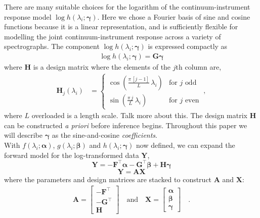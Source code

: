 \documentclass[modern]{aastex631}
\renewcommand{\vec}[1]{\mathbf{#1}}
\newcommand{\vecalpha}{\boldsymbol{\alpha}}
\newcommand{\vecbeta}{\boldsymbol{\beta}}
\newcommand{\vecgamma}{\boldsymbol{\gamma}}
\newcommand{\transpose}{^\top}
\newcommand{\todo}[1]{\textcolor{tab:red}{#1}}
\begin{document}
There are many suitable choices for the logarithm of the continuum-instrument response model $\log{h(\lambda_i;\vecgamma)}$. Here we chose a Fourier basis of sine and cosine functions because it is a linear representation, and is sufficiently flexible for modelling the joint continuum-instrument response across a variety of spectrographs. The component $\log{h(\lambda_i;\vecgamma)}$ is expressed compactly as
\begin{align}
    \log{h(\lambda_i;\vecgamma)} = \vec{G}\vecgamma
\end{align}
where $\vec{H}$ is a design matrix where the elements of the $j$th column are, %
\begin{align}
    \vec{H}_{j}(\lambda_i) & = \left\{\begin{array}{cl}\displaystyle\cos\left(\frac{\pi\,[j-1]}{L}\,\lambda_i\right) & \mbox{for $j$ odd} \\[3ex]
                                       \displaystyle\sin\left(\frac{\pi\,j}{L}\,\lambda_i\right) & \mbox{for $j$ even}\end{array}\right. ~,
\end{align}
\noindent{}where $L$ \todo{overloaded} is a length scale. \todo{Talk more about this.}
The design matrix $\vec{H}$ can be constructed \emph{a priori} before inference begins. Throughout this paper we will describe $\vecgamma$ as the sine-and-cosine \emph{coefficients}.\\

\noindent{}With $f(\lambda_i;\vecalpha)$, $g(\lambda_i;\vecbeta)$ and $h(\lambda_i;\vecgamma)$ now defined, we can expand the forward model for the log-transformed data $\vec{Y}$,
\begin{equation}
    \vec{Y} = -\vec{F}\transpose\vecalpha - \vec{G}\transpose\vecbeta + \vec{H}\vecgamma
\end{equation}
\begin{equation}
    \vec{Y} = \vec{A}\vec{X}
\end{equation}
where the parameters and design matrices are stacked to construct $\vec{A}$ and $\vec{X}$:
\begin{eqnarray}
    \vec{A} = \begin{bmatrix}-\vec{F}\transpose\\-\vec{G}\transpose\\\vec{H}\end{bmatrix}
    \quad \mbox{and} \quad 
    \vec{X} = \begin{bmatrix}\vecalpha\\\vecbeta\\\vecgamma\end{bmatrix} \quad .
\end{eqnarray}
\end{document}
